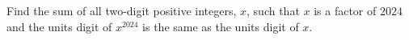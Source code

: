 Find the sum of all two-digit positive integers, $x$, such that $x$ is a factor of $2024$ and the units digit of $x^{2024}$ is the same as the units digit of $x$.
